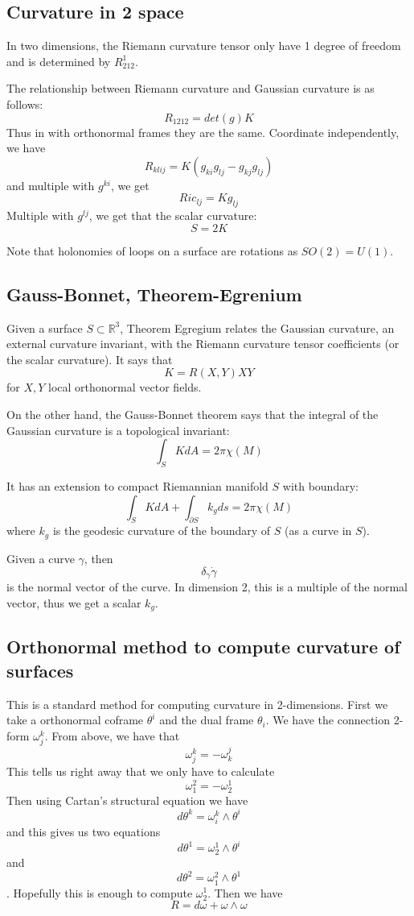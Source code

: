 \documentclass[main.tex]{subfiles}
\begin{document}
\subsection{Curvature in 2 space}

In two dimensions, the Riemann curvature tensor only have 1 degree of freedom and is determined by 
$R^1 _{212}$. 

The relationship between Riemann curvature and Gaussian curvature is as follows:
$$
R_{1212} = det(g) K
$$
Thus in with orthonormal frames they are the same. Coordinate independently, we have 
$$
R_{klij} = K (g_{ki}g_{lj} - g_{kj}g_{lj})
$$
and multiple with $g^{ki}$, we get 
$$
Ric_{lj} = K g_{lj}
$$
Multiple with $g^{lj}$, we get that the scalar curvature:
$$
S = 2K
$$

\begin{remark}
Note that holonomies of loops on a surface are rotations as $SO(2) = U(1)$.
\end{remark}
\subsection{Gauss-Bonnet, Theorem-Egrenium}

Given a surface $S \subset \mathbb{R}^3$, Theorem Egregium relates the Gaussian curvature, an external curvature invariant, with the Riemann curvature tensor coefficients (or the scalar curvature). It says that 
$$
K = R(X, Y) X Y
$$
for $X, Y$ local orthonormal vector fields. 

On the other hand, the Gauss-Bonnet theorem says that the integral of the Gaussian curvature is a topological invariant:
$$
\int_S K dA = 2 \pi \chi(M)
$$

It has an extension to compact Riemannian manifold $S$ with boundary:
$$
\int_S K dA + \int_{\partial S}k_g ds = 2\pi \chi(M)
$$
where $k_g$ is the geodesic curvature of the boundary of $S$ (as a curve in $S$).

Given a curve $\gamma$, then 
$$
\delta_\dot{\gamma} \dot{\gamma}
$$
is the normal vector of the curve. In dimension 2, this is a multiple of the normal vector, thus we get a scalar $k_g$.

\subsection{Orthonormal method to compute curvature of surfaces}
This is a standard method for computing curvature in 2-dimensions. First we take a orthonormal coframe $\theta^i$ and the dual frame $\theta_i$. We have the connection 2-form $\omega_j ^k$. From above, we have that 
$$
\omega_j ^k = - \omega_k ^j
$$
This tells us right away that we only have to calculate 
$$
\omega_1 ^2 = - \omega_2 ^1
$$
Then using Cartan's structural equation we have $$
d\theta^k = \omega^k _i \wedge \theta^i
$$
and this gives us two equations
$$
d\theta^1 = \omega^1 _2 \wedge \theta^i
$$ and 
$$
d\theta^2 = \omega^2 _1 \wedge \theta^1
$$. 
Hopefully this is enough to compute $\omega^1_2$. Then we have 
$$
R = d \omega + \omega \wedge \omega
$$
\end{document}
